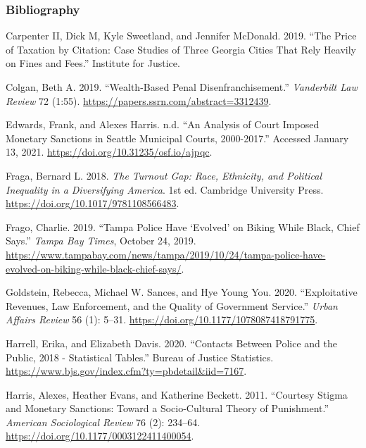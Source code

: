 \documentclass[
  12pt,
]{article}
\newlength{\cslhangindent}
\newenvironment{cslreferences}%
  {\setlength{\parindent}{0pt}%
  \everypar{\setlength{\hangindent}{\cslhangindent}}\ignorespaces}%
  {\par}
\begin{document}
\newpage

\hypertarget{bibliography}{%
\subsubsection*{Bibliography}\label{bibliography}}

\hypertarget{refs}{}
\begin{cslreferences}
\leavevmode\hypertarget{ref-CarpenterII2019}{}%
Carpenter II, Dick M, Kyle Sweetland, and Jennifer McDonald. 2019. ``The Price of Taxation by Citation: Case Studies of Three Georgia Cities That Rely Heavily on Fines and Fees.'' Institute for Justice.

\leavevmode\hypertarget{ref-Colgan2019}{}%
Colgan, Beth A. 2019. ``Wealth-Based Penal Disenfranchisement.'' \emph{Vanderbilt Law Review} 72 (1:55). \url{https://papers.ssrn.com/abstract=3312439}.

\leavevmode\hypertarget{ref-Edwards2020}{}%
Edwards, Frank, and Alexes Harris. n.d. ``An Analysis of Court Imposed Monetary Sanctions in Seattle Municipal Courts, 2000-2017.'' Accessed January 13, 2021. \url{https://doi.org/10.31235/osf.io/ajpqc}.

\leavevmode\hypertarget{ref-Fraga2018}{}%
Fraga, Bernard L. 2018. \emph{The Turnout Gap: Race, Ethnicity, and Political Inequality in a Diversifying America}. 1st ed. Cambridge University Press. \url{https://doi.org/10.1017/9781108566483}.

\leavevmode\hypertarget{ref-Frago2019}{}%
Frago, Charlie. 2019. ``Tampa Police Have `Evolved' on Biking While Black, Chief Says.'' \emph{Tampa Bay Times}, October 24, 2019. \url{https://www.tampabay.com/news/tampa/2019/10/24/tampa-police-have-evolved-on-biking-while-black-chief-says/}.

\leavevmode\hypertarget{ref-Goldstein2020}{}%
Goldstein, Rebecca, Michael W. Sances, and Hye Young You. 2020. ``Exploitative Revenues, Law Enforcement, and the Quality of Government Service.'' \emph{Urban Affairs Review} 56 (1): 5--31. \url{https://doi.org/10.1177/1078087418791775}.

\leavevmode\hypertarget{ref-Harrell2020}{}%
Harrell, Erika, and Elizabeth Davis. 2020. ``Contacts Between Police and the Public, 2018 - Statistical Tables.'' Bureau of Justice Statistics. \url{https://www.bjs.gov/index.cfm?ty=pbdetail\&iid=7167}.

\leavevmode\hypertarget{ref-Harris2011}{}%
Harris, Alexes, Heather Evans, and Katherine Beckett. 2011. ``Courtesy Stigma and Monetary Sanctions: Toward a Socio-Cultural Theory of Punishment.'' \emph{American Sociological Review} 76 (2): 234--64. \url{https://doi.org/10.1177/0003122411400054}.


\end{cslreferences}
\end{document}
